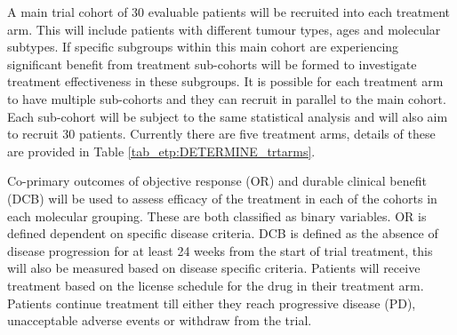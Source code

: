 A main trial cohort of 30 evaluable patients will be recruited into each treatment arm. This will include patients with different tumour types, ages and molecular subtypes. If specific subgroups within this main cohort are experiencing significant benefit from treatment sub-cohorts will be formed to investigate treatment effectiveness in these subgroups. It is possible for each treatment arm to have multiple sub-cohorts and they can recruit in parallel to the main cohort. Each sub-cohort will be subject to the same statistical analysis and will also aim to recruit 30 patients. Currently there are five treatment arms, details of these are provided in Table \ref{tab_etp:DETERMINE_trtarms}. 

\begin{table}[h!]
	\fontsize{10pt}{10pt}\selectfont
	\centering
	\caption{Current treatment arms in DETERMINE}
	\label{tab_etp:DETERMINE_trtarms}
\end{table}

Co-primary outcomes of objective response (OR) and durable clinical benefit (DCB) will be used to assess efficacy of the treatment in each of the cohorts in each molecular grouping. These are both classified as binary variables. OR is defined dependent on specific disease criteria. DCB is defined as the absence of disease progression for at least 24 weeks from the start of trial treatment, this will also be measured based on disease specific criteria. Patients will receive treatment based on the license schedule for the drug in their treatment arm. Patients continue treatment till either they reach progressive disease (PD), unacceptable adverse events or withdraw from the trial. 

